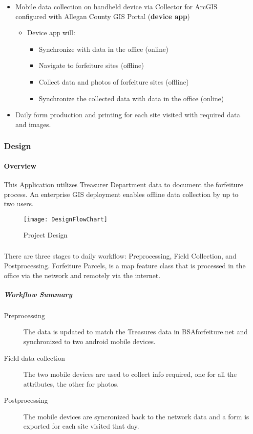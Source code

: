 \documentclass[class=article , crop=false, titlepage, twoside, multi={itemize, figure, verbatim}, float=false]{standalone}
\begin{document}
\begin{itemize} %

\item Mobile data collection on handheld device via Collector for ArcGIS configured with Allegan County GIS Portal  (\textbf{device app})

\begin{itemize} %

\item Device app will:

\begin{itemize} %

\item Synchronize with data in the office (online)
\item Navigate to forfeiture sites (offline)
\item Collect data and photos of forfeiture sites (offline)
\item Synchronize the collected data with data in the office (online)
\end{itemize} %

\end{itemize} %

\item Daily form production and printing for each site visited with required data and images.

\end{itemize} %

\clearpage
\subsubsection{Design}
\paragraph{Overview}This Application utilizes Treasurer Department data to document the forfeiture process.  An enterprise GIS deployment enables offline data collection by up to two users.
\begin{figure}
\centering
    \texttt{[image: DesignFlowChart]}
\caption{Project Design}
\end{figure}
\subparagraph*{}There are three stages to daily workflow: Preprocessing, Field Collection, and Postprocessing.  Forfeiture Parcels, is a map feature class that is processed in the office via the network and remotely via the internet.
\clearpage
\subparagraph{Workflow Summary}
\begin{description}
\item [Preprocessing] The data is updated to match the Treasures data in BSAforfeiture.net and synchronized to two android mobile devices.
\item [Field data collection] The two mobile devices are used to collect info required, one for all the attributes, the other for photos.
\item[Postprocessing] The mobile devices are syncronized back to the network data and a form is exported for each site visited that day.
\end{description}
\end{document}
